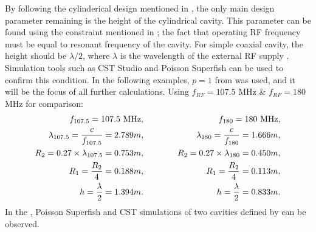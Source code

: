 \documentclass[a4paper,oneside,12pt]{report}
\numberwithin{equation}{chapter}
\begin{document}
By following the cylinderical design mentioned in , the only main design parameter remaining is the height of the cylindrical cavity.
This parameter can be found using the constraint mentioned in ; the fact that operating RF frequency must be equal to resonant frequency of the cavity.
For simple coaxial cavity, the height should be $\lambda/2$, where $\lambda$ is the wavelength of the external RF supply \cite{rhodo_pottier}.
Simulation tools such as CST Studio and Poisson Superfish can be used to confirm this condition.
\clearpage
In the following examples, $p=1$ from  was used, and it will be the focus of all further calculations.
Using $f_{RF}=107.5$ MHz \& $f_{RF}=180$ MHz for comparison:
\vspace{-20pt}\begin{eqnarray} \label{eq:107_180_MHZ_cavity_design_parameters}
    \begin{aligned}
        f_{107.5} = 107.5 \textrm{ MHz}  , \\
        \lambda_{107.5}  = \frac{c}{f_{107.5}} = 2.789 m   ,\\
        R_2 = 0.27 \times \lambda_{107.5} = 0.753 m   ,\\
        R_1 = \frac{R_2}{4} = 0.188 m   ,\\
        h = \frac{\lambda}{2} = 1.394 m .
    \end{aligned}
    \qquad\qquad
    \begin{aligned}
        f_{180} = 180 \textrm{ MHz}   ,\\
        \lambda_{180}  = \frac{c}{f_{180}} = 1.666 m  , \\
        R_2 = 0.27 \times\lambda_{180} = 0.450 m  , \\
        R_1 = \frac{R_2}{4} = 0.113 m  , \\
        h = \frac{\lambda}{2} = 0.833 m . 
    \end{aligned}
\vspace{-10pt}\end{eqnarray}
In the , 
Poisson Superfish and CST simulations of two cavities defined by  can be observed.
\iffalse
\end{document}

